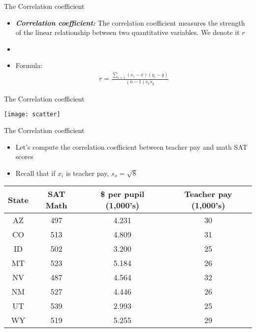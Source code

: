 \documentclass[xcolor=dvipsnames]{beamer}
\begin{document}
\begin{frame}{The Correlation coefficient}
	\begin{itemize}
		\item \textbf{\emph{Correlation coefficient:}} The correlation coefficient measures the strength of the linear relationship between two quantitative variables. We denote it $r$
		\item[]
		\item Formula: 
		\begin{gather*}
			r = \frac{\sum_{i=1}(x_i -\bar{x})(y_i - \bar{y})}{(n-1) s_x s_y}
		\end{gather*}
	\end{itemize}
\end{frame}

\begin{frame}{The Correlation coefficient}
	\begin{center}
		\texttt{[image: scatter]}
	\end{center}
\end{frame}

\begin{frame}{The Correlation coefficient}
	\begin{itemize}
		\item Let's compute the correlation coefficient between teacher pay and math SAT scores
		\item Recall that if $x_i$ is teacher pay, $s_x = \sqrt{8}$
	\end{itemize}
		\begin{center}
		\begin{tabular}{|c|c|c|c|}
			\hline 
			\textbf{State} & \textbf{SAT Math} & \textbf{\$ per pupil (1,000's)} & \textbf{Teacher pay (1,000's)} \\ 
			\hline \hline
			AZ & 497  & 4.231 & 30 \\ \hline 
			CO & 513  & 4.809 & 31 \\ \hline 
			ID & 502  & 3.200 & 25  \\  \hline 
			MT & 523  & 5.184 & 26 \\ \hline 
			NV & 487  & 4.564 & 32 \\ \hline 
			NM & 527  & 4.446 & 26 \\ \hline 
			UT & 539  & 2.993 & 25 \\ \hline 
			WY & 519  & 5.255 & 29 \\ \hline 
		\end{tabular} 
	\end{center}
\end{frame}
\end{document}
